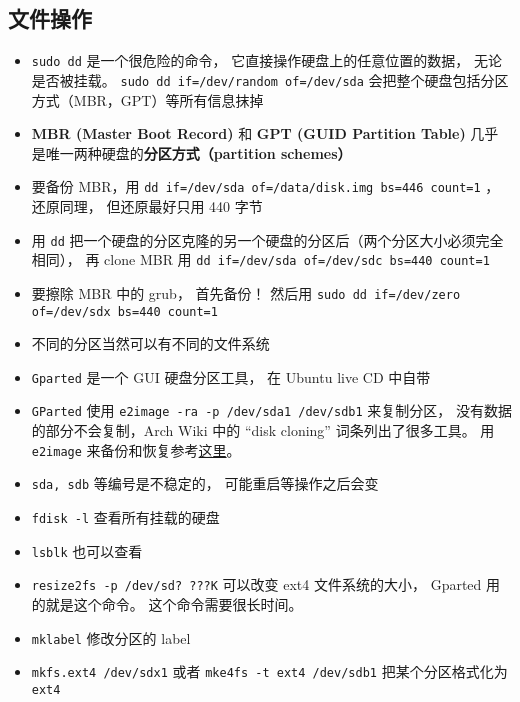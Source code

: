 
\begin{issues}
\issueDraft
\end{issues}

\subsection{文件操作}
\begin{itemize}
\item \verb|sudo dd| 是一个很危险的命令， 它直接操作硬盘上的任意位置的数据， 无论是否被挂载。 \verb|sudo dd if=/dev/random of=/dev/sda| 会把整个硬盘包括分区方式（MBR，GPT）等所有信息抹掉
\item \textbf{MBR (Master Boot Record)} 和 \textbf{GPT (GUID Partition Table)} 几乎是唯一两种硬盘的\textbf{分区方式（partition schemes）}
\item 要备份 MBR，用 \verb|dd if=/dev/sda of=/data/disk.img bs=446 count=1| ， 还原同理， 但还原最好只用 440 字节
\item 用 \verb|dd| 把一个硬盘的分区克隆的另一个硬盘的分区后（两个分区大小必须完全相同）， 再 clone MBR 用 \verb|dd if=/dev/sda of=/dev/sdc bs=440 count=1|
\item 要擦除 MBR 中的 grub， 首先备份！ 然后用 \verb|sudo dd if=/dev/zero of=/dev/sdx bs=440 count=1|
\item 不同的分区当然可以有不同的文件系统
\item \verb|Gparted| 是一个 GUI 硬盘分区工具， 在 Ubuntu live CD 中自带
\item \verb|GParted| 使用 \verb|e2image -ra -p /dev/sda1 /dev/sdb1| 来复制分区， 没有数据的部分不会复制，Arch Wiki 中的 “disk cloning” 词条列出了很多工具。 用 \verb|e2image| 来备份和恢复参考\href{https://stackoverflow.com/questions/51755887/backup-and-restore-e2image-how-do-i-properly-pipe-the-output-from-lzop}{这里}。
\item \verb|sda, sdb| 等编号是不稳定的， 可能重启等操作之后会变
\item \verb|fdisk -l| 查看所有挂载的硬盘
\item \verb|lsblk| 也可以查看
\item \verb|resize2fs -p /dev/sd? ???K| 可以改变 ext4 文件系统的大小， Gparted 用的就是这个命令。 这个命令需要很长时间。
\item \verb|mklabel| 修改分区的 label
\item \verb|mkfs.ext4 /dev/sdx1| 或者 \verb|mke4fs -t ext4 /dev/sdb1| 把某个分区格式化为 \verb|ext4|

\end{itemize}
